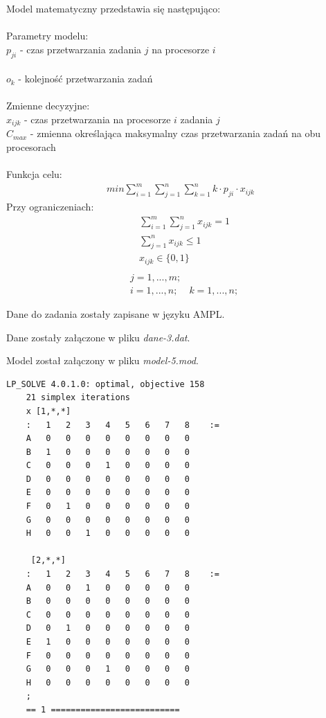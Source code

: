\documentclass[
    12pt, %
]{../fphw}
\begin{document}
Model matematyczny przedstawia się następująco: \\ \\
Parametry modelu: \\
\(p_{ji}\) - czas przetwarzania zadania \(j\) na procesorze \(i\) \\ \\
\(o_{k}\) - kolejność przetwarzania zadań \\ \\
Zmienne decyzyjne: \\
\(x_{ijk}\) - czas przetwarzania na procesorze \(i\) zadania \(j\) \\
\(C_{max}\) - zmienna określająca maksymalny czas przetwarzania zadań na obu procesorach \\ \\
Funkcja celu: \\
\begin{align*}
    min \sum^m_{i=1}\sum^n_{j=1}\sum^n_{k=1} k \cdot p_{ji} \cdot x_{ijk}
\end{align*}
Przy ograniczeniach: \\
\begin{align*}
     & \sum^m_{i=1} \sum^n_{j=1} x_{ijk} = 1 \\
     & \sum^n_{j=1} x_{ijk} \leq 1           \\
     & x_{ijk} \in  \{0,1\}                  \\
\end{align*}
\begin{align*}
     & j = 1, ..., m; \\
     & i = 1, ..., n;
     & k = 1, ..., n;
\end{align*}

\newpage

Dane do zadania zostały zapisane w języku AMPL.

Dane zostały załączone w pliku \textit{dane-3.dat}.


Model został załączony w pliku \textit{model-5.mod}.

\newpage

\begin{lstlisting}[caption=Rozwiązanie znalezione solwerem lpsolve]
    LP_SOLVE 4.0.1.0: optimal, objective 158
    21 simplex iterations
    x [1,*,*]
    :   1   2   3   4   5   6   7   8    :=
    A   0   0   0   0   0   0   0   0
    B   1   0   0   0   0   0   0   0
    C   0   0   0   1   0   0   0   0
    D   0   0   0   0   0   0   0   0
    E   0   0   0   0   0   0   0   0
    F   0   1   0   0   0   0   0   0
    G   0   0   0   0   0   0   0   0
    H   0   0   1   0   0   0   0   0
    
     [2,*,*]
    :   1   2   3   4   5   6   7   8    :=
    A   0   0   1   0   0   0   0   0
    B   0   0   0   0   0   0   0   0
    C   0   0   0   0   0   0   0   0
    D   0   1   0   0   0   0   0   0
    E   1   0   0   0   0   0   0   0
    F   0   0   0   0   0   0   0   0
    G   0   0   0   1   0   0   0   0
    H   0   0   0   0   0   0   0   0
    ;
    == 1 ==========================
\end{lstlisting}
\end{document}
